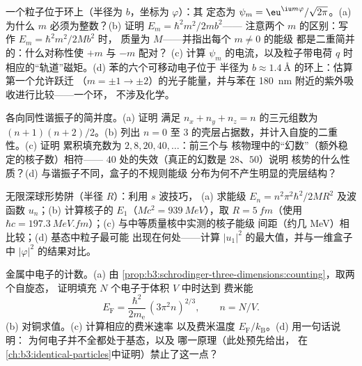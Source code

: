 \begin{exercise}[$\star\star$]\label{exo:b3:schrodinger-three-dimensions:5}
一个粒子位于环上（半径为 $b$，坐标为 $\varphi$）：其
定态为 $\psi_m = \eu^{\iu m\varphi}/\sqrt{2\pi}$。(a) 为什么
$m$ 必须为整数？(b) 证明 $E_m = \hbar^2m^2/2mb^2$——
注意两个 $m$ 的区别：写作 $E_m = \hbar^2 m^2/2Mb^2$ 时，
质量为 $M$——并指出每个 $m \neq 0$ 的能级
都是二重简并的：什么对称性使 $+m$ 与 $-m$ 配对？
(c) 计算 $\psi_m$ 的电流，以及粒子带电荷 $q$ 时
相应的“轨道”磁矩。(d) 苯的六个可移动电子位于
半径为 $b \approx \qty{1.4}{\angstrom}$ 的环上：估算第一个允许跃迁
（$m = \pm1 \to \pm2$）的光子能量，并与苯在 \qty{180}{nm}
附近的紫外吸收进行比较——一个环，
不涉及化学。
\end{exercise}

\begin{exercise}[$\star\star$]\label{exo:b3:schrodinger-three-dimensions:6}
各向同性谐振子的简并度。(a) 证明
满足 $n_x + n_y + n_z = n$ 的三元组数为 $(n+1)(n+2)/2$。(b) 列出
$n = 0$ 至 $3$ 的壳层占据数，并计入自旋的二重性。(c) 证明
累积填充数为 $2, 8, 20, 40, \dots$：前三个与
核物理中的“幻数”（额外稳定的核子数）相符——
$40$ 处的失效（真正的幻数是 $28$、$50$）说明
核势的什么性质？(d) 与谐振子不同，盒子的不规则能级
分布为何不产生明显的壳层结构？
\end{exercise}

\begin{exercise}[$\star\star$]\label{exo:b3:schrodinger-three-dimensions:7}
无限深球形势阱（半径 $R$）：利用 $s$ 波技巧，
(a) 求能级 $E_n = n^2\pi^2\hbar^2/2MR^2$ 及波
函数 $u_n$；(b) 计算核子的 $E_1$（$Mc^2 =
\qty{939}{MeV}$），取 $R = \qty{5}{fm}$（使用 $\hbar c =
\qty{197.3}{MeV.fm}$）；(c) 与中等质量核中实测的核子能级
间距（约几 MeV）相比较；(d) 基态中粒子最可能
出现在何处——计算
$|u_1|^2$ 的最大值，并与一维盒子中 $|\varphi|^2$ 的结果对比。
\end{exercise}

\begin{exercise}[$\star\star$]\label{exo:b3:schrodinger-three-dimensions:8}
金属中电子的计数。(a) 由
\cref{prop:b3:schrodinger-three-dimensions:counting}，取两个自旋态，
证明填充 $N$ 个电子于体积 $V$ 中时达到
费米能
\[
E_{\text{F}} = \frac{\hbar^2}{2m_{\text{e}}}\,(3\pi^2n)^{2/3} ,
\qquad n = N/V .
\]
(b) 对铜求值。(c) 计算相应的费米速率
以及费米温度 $E_{\text{F}}/k_{\text{B}}$。(d) 用一句话说明：
为何电子并不全都处于基态，以及
哪一原理（此处预先给出，
在\cref{ch:b3:identical-particles}中证明）禁止了这一点？
\end{exercise}

